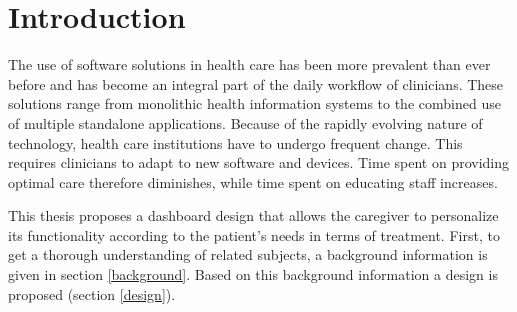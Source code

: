 \section{Introduction}

The use of software solutions in health care has been more prevalent than ever before and has become an integral part of the daily workflow of clinicians. These solutions range from monolithic health information systems to the combined use of multiple standalone applications. Because of the rapidly evolving nature of technology, health care institutions have to undergo frequent change. This requires clinicians to adapt to new software and devices. Time spent on providing optimal care therefore diminishes, while time spent on educating staff increases.



This thesis proposes a dashboard design that allows the caregiver to personalize its functionality according to the patient's needs in terms of treatment. First, to get a thorough understanding of related subjects, a background information is given in section \ref{background}. Based on this background information a design is proposed (section \ref{design}).